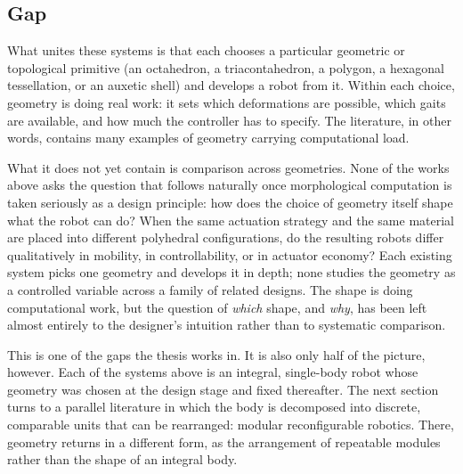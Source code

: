 \subsection{Gap}
\label{subsec:mc-gap}

What unites these systems is that each chooses a particular geometric or topological primitive (an octahedron, a triacontahedron, a polygon, a hexagonal tessellation, or an auxetic shell) and develops a robot from it. Within each choice, geometry is doing real work: it sets which deformations are possible, which gaits are available, and how much the controller has to specify. The literature, in other words, contains many examples of geometry carrying computational load.

What it does not yet contain is comparison across geometries. None of the works above asks the question that follows naturally once morphological computation is taken seriously as a design principle: how does the choice of geometry itself shape what the robot can do? When the same actuation strategy and the same material are placed into different polyhedral configurations, do the resulting robots differ qualitatively in mobility, in controllability, or in actuator economy? Each existing system picks one geometry and develops it in depth; none studies the geometry as a controlled variable across a family of related designs. The shape is doing computational work, but the question of \textit{which} shape, and \textit{why}, has been left almost entirely to the designer's intuition rather than to systematic comparison.

This is one of the gaps the thesis works in. It is also only half of the picture, however. Each of the systems above is an integral, single-body robot whose geometry was chosen at the design stage and fixed thereafter. The next section turns to a parallel literature in which the body is decomposed into discrete, comparable units that can be rearranged: modular reconfigurable robotics. There, geometry returns in a different form, as the arrangement of repeatable modules rather than the shape of an integral body.
